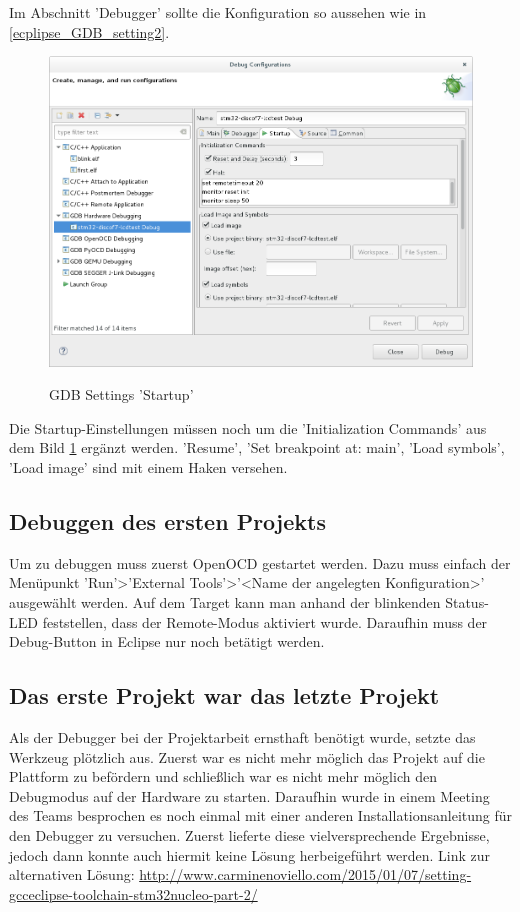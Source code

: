 \documentclass[12pt,a4paper]{article}
\begin{document}
Im Abschnitt 'Debugger' sollte die Konfiguration so aussehen wie in \ref{ecplipse_GDB_setting2}.
\begin{figure}[h]
\begin{center}
\includegraphics[width=12cm]{grafiken/debugger/GDBsetting3.png}
\label{ecplipse_GDB_setting3}
\caption{GDB Settings 'Startup'}
\end{center}
\end{figure}
Die Startup-Einstellungen müssen noch um die 'Initialization Commands' aus dem Bild \ref{ecplipse_GDB_setting3} ergänzt werden.
'Resume', 'Set breakpoint at: main', 'Load symbols', 'Load image' sind mit einem Haken versehen. 
\FloatBarrier
\subsection{Debuggen des ersten Projekts}
Um zu debuggen muss zuerst OpenOCD gestartet werden. Dazu muss einfach der Menüpunkt 'Run'>'External Tools'>'<Name der angelegten Konfiguration>' ausgewählt werden. Auf dem Target kann man anhand der blinkenden Status-LED feststellen, dass der Remote-Modus aktiviert wurde. Daraufhin muss der Debug-Button in Eclipse nur noch betätigt werden.
\subsection{Das erste Projekt war das letzte Projekt}
Als der Debugger bei der Projektarbeit ernsthaft benötigt wurde, setzte das Werkzeug plötzlich aus. Zuerst war es nicht mehr möglich das Projekt auf die Plattform zu befördern und schließlich war es nicht mehr möglich den Debugmodus auf der Hardware zu starten. 
Daraufhin wurde in einem Meeting des Teams besprochen es noch einmal mit einer anderen Installationsanleitung für den Debugger zu versuchen. Zuerst lieferte diese vielversprechende Ergebnisse, jedoch dann konnte auch hiermit keine Lösung herbeigeführt werden. 
Link zur alternativen Lösung: \url{http://www.carminenoviello.com/2015/01/07/setting-gcceclipse-toolchain-stm32nucleo-part-2/}
\end{document}
